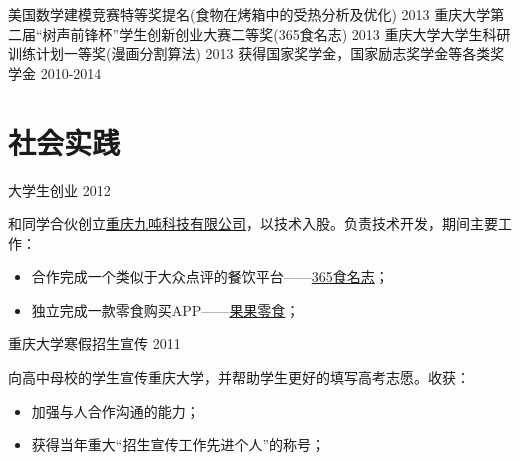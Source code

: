 \documentclass[]{friggeri-cv_cn} %
\begin{document}
\begin{entrylist}
\entryac
{美国数学建模竞赛特等奖提名(食物在烤箱中的受热分析及优化)}
{2013}
\entryac
{重庆大学第二届“树声前锋杯”学生创新创业大赛二等奖(365食名志)}
{2013}
\entryac
{重庆大学大学生科研训练计划一等奖(漫画分割算法)}
{2013}
\entryac
{获得国家奖学金，国家励志奖学金等各类奖学金}
{2010-2014}

\end{entrylist}


\section{社会实践}
\begin{entrylist}
\entry
{大学生创业}
{2012}
{和同学合伙创立\href{http://nineton.cn/}{重庆九吨科技有限公司}，以技术入股。负责技术开发，期间主要工作：
\begin{itemize}
\item 合作完成一个类似于大众点评的餐饮平台------\href{http://nineton.cn/product.php?id=17}{365食名志}；
\item 独立完成一款零食购买APP------\href{http://apk.gfan.com/Product/App584080.html}{果果零食}；
\end{itemize}
}
\end{entrylist}

\begin{entrylist}
\entry
{重庆大学寒假招生宣传}
{2011}
{向高中母校的学生宣传重庆大学，并帮助学生更好的填写高考志愿。收获：
\begin{itemize}
    \item 加强与人合作沟通的能力；
    \item 获得当年重大“招生宣传工作先进个人”的称号；
\end{itemize}
}
\end{entrylist}
\end{document}
